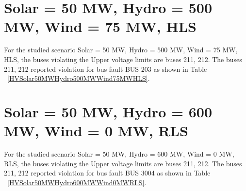 \documentclass[10pt]{report}
\begin{document}
\section{Solar = 50 MW, Hydro = 500 MW, Wind = 75 MW, HLS}
For the studied scenario Solar = 50 MW, Hydro = 500 MW, Wind = 75 MW, HLS, the buses violating the Upper voltage limits are buses 211, 212.
The buses 211, 212 reported violation for bus fault BUS 203 as shown in Table ~\ref{HVSolar50MWHydro500MWWind75MWHLS}.
\begin{table}[H]
\caption{Contingencies reporting bus voltages greater than emergency voltage of 1.1 PU for scenario Solar = 50 MW, Hydro = 500 MW, Wind = 75 MW, HLS}
\label{HVSolar50MWHydro500MWWind75MWHLS}
\centering
{}
\end{table}


\section{Solar = 50 MW, Hydro = 600 MW, Wind = 0 MW, RLS}
For the studied scenario Solar = 50 MW, Hydro = 600 MW, Wind = 0 MW, RLS, the buses violating the Upper voltage limits are buses 211, 212.
The buses 211, 212 reported violation for bus fault BUS 3004 as shown in Table ~\ref{HVSolar50MWHydro600MWWind0MWRLS}.
\begin{table}[H]
\caption{Contingencies reporting bus voltages greater than emergency voltage of 1.1 PU for scenario Solar = 50 MW, Hydro = 600 MW, Wind = 0 MW, RLS}
\label{HVSolar50MWHydro600MWWind0MWRLS}
\centering
{}
\end{table}
\end{document}
